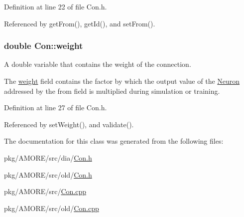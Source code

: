 Definition at line 22 of file Con.h.



Referenced by getFrom(), getId(), and setFrom().

\hypertarget{class_con_a7f46485ba5b41971ea38641f9e7d1be0}{
\subsubsection[{weight}]{\setlength{\rightskip}{0pt plus 5cm}double {\bf Con::weight}}}
\label{class_con_a7f46485ba5b41971ea38641f9e7d1be0}


A double variable that contains the weight of the connection. 

The \hyperlink{class_con_a7f46485ba5b41971ea38641f9e7d1be0}{weight} field contains the factor by which the output value of the \hyperlink{class_neuron}{Neuron} addressed by the from field is multiplied during simulation or training. 

Definition at line 27 of file Con.h.



Referenced by setWeight(), and validate().



The documentation for this class was generated from the following files:\begin{DoxyCompactItemize}
\item 
pkg/AMORE/src/dia/\hyperlink{dia_2_con_8h}{Con.h}\item 
pkg/AMORE/src/old/\hyperlink{old_2_con_8h}{Con.h}\item 
pkg/AMORE/src/\hyperlink{_con_8cpp}{Con.cpp}\item 
pkg/AMORE/src/old/\hyperlink{old_2_con_8cpp}{Con.cpp}\end{DoxyCompactItemize}
